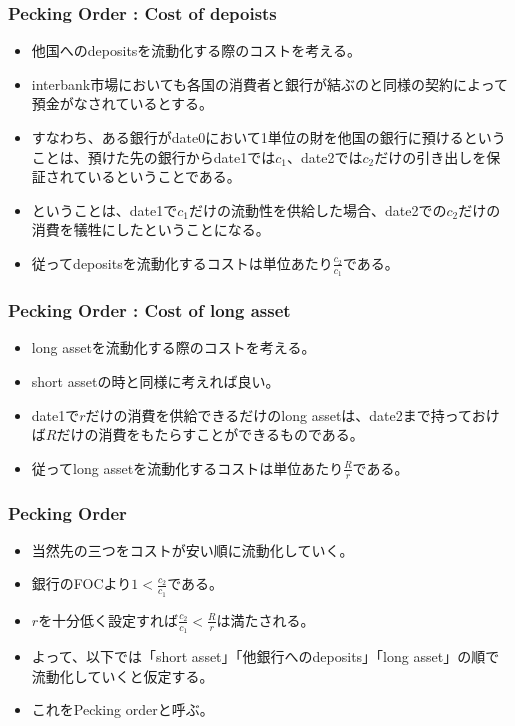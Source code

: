 \documentclass[dvipdfmx, 12pt]{beamer}
\begin{document}
\begin{frame}\frametitle{Pecking Order : Cost of depoists}
	\begin{itemize}
	\item 他国へのdepositsを流動化する際のコストを考える。
	\item interbank市場においても各国の消費者と銀行が結ぶのと同様の契約によって預金がなされているとする。
	\item すなわち、ある銀行がdate0において1単位の財を他国の銀行に預けるということは、預けた先の銀行からdate1では$c_1$、date2では$c_2$だけの引き出しを保証されているということである。
	\item ということは、date1で$c_1$だけの流動性を供給した場合、date2での$c_2$だけの消費を犠牲にしたということになる。
	\item 従ってdepositsを流動化するコストは単位あたり$\frac{c_2}{c_1}$である。
	\end{itemize}
\end{frame}

\begin{frame}\frametitle{Pecking Order : Cost of long asset}
	\begin{itemize}
	\item long assetを流動化する際のコストを考える。
	\item short assetの時と同様に考えれば良い。
	\item date1で$r$だけの消費を供給できるだけのlong assetは、date2まで持っておけば$R$だけの消費をもたらすことができるものである。
	\item 従ってlong assetを流動化するコストは単位あたり$\frac{R}{r}$である。
	\end{itemize}
\end{frame}

\begin{frame}\frametitle{Pecking Order}
	\begin{itemize}
	\item 当然先の三つをコストが安い順に流動化していく。
	\item 銀行のFOCより$1 < \frac{c_2}{c_1}$である。
	\item $r$を十分低く設定すれば$\frac{c_2}{c_1} < \frac{R}{r}$は満たされる。
	\item よって、以下では「short asset」「他銀行へのdeposits」「long asset」の順で流動化していくと仮定する。
	\item これをPecking orderと呼ぶ。
	\end{itemize}
\end{frame}
\end{document}
